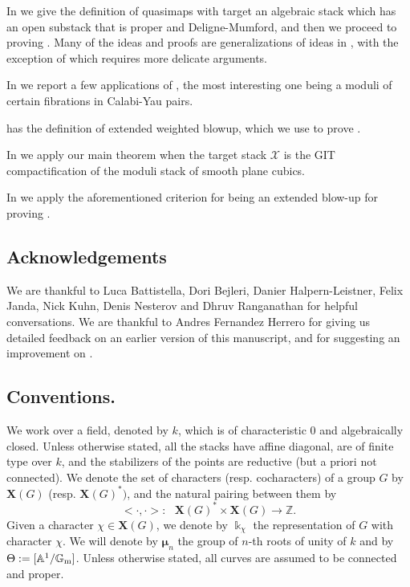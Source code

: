 \documentclass{amsart}
\newcommand{\bA}{\mathbb{A}}
\newcommand{\bG}{\mathbb{G}}
\newcommand{\bZ}{\mathbb{Z}}
\newcommand{\cX}{\mathcal{X}}
\newcommand{\Gm}{\bG_{{\rm m}}}
\newcommand{\bmu}{\bm{\mu}}
\theoremstyle{definition}
\theoremstyle{definition}
\begin{document}
{ In  we give the definition of quasimaps with target an algebraic stack which has an open substack that is proper and Deligne-Mumford, and then we proceed to proving . Many of the ideas and proofs are generalizations of ideas in \cites{orbifold_qmap_theory, ciocan2014stable}, with the exception of  which requires more delicate arguments. 

 In  we report a few {applications} of , the most interesting one being a moduli of certain fibrations in Calabi-Yau pairs.
 
  has the definition of extended weighted blowup, which we use to prove . 
 
In  we apply our main theorem when the target stack $\cX$ is the GIT compactification of the moduli stack of smooth plane cubics.

In  we apply the aforementioned criterion for being an extended blow-up for proving .

 \subsection{Acknowledgements} We are thankful to Luca Battistella, Dori Bejleri, Danier Halpern-Leistner, Felix Janda, Nick Kuhn, Denis Nesterov and Dhruv Ranganathan for helpful conversations. We are thankful to Andres 
Fernandez Herrero for giving us detailed feedback on an earlier version of this manuscript, and for suggesting an improvement on .
 
 \subsection{Conventions.} We work over a field, denoted by $k$, which is of characteristic 0 and algebraically closed. Unless otherwise stated, all the stacks have affine diagonal, are of finite type over $k$, and the stabilizers of the points are reductive (but a priori not connected).
 We denote the set of characters (resp. cocharacters) of a group $G$ by $\mathbf{X}(G)$ (resp. $\mathbf{X}(G)^*)$, and the natural pairing between them by \[<\cdot, \cdot >:\text{ }\mathbf{X}(G)^*\times \mathbf{X}(G)\to \bZ. \] 
 Given a character $\chi\in \mathbf{X}(G)$, we denote by $\Bbbk_\chi$ the representation of $G$ with character $\chi$.
 We will denote by $\bmu_n$ the group of $n$-th roots of unity of $k$ and by $\Theta:=[\bA^1/\Gm]$. Unless otherwise stated, all curves are assumed to be connected and proper.
}
\end{document}
